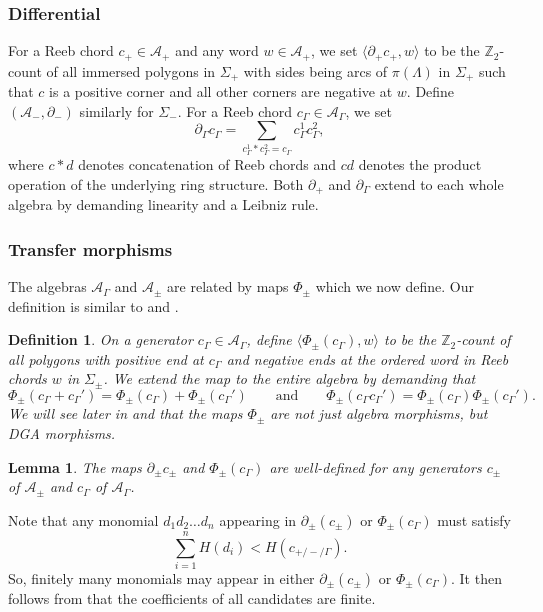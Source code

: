 \documentclass[11pt]{amsart}
\makeatletter
\renewenvironment{proof}[1][\proofname] {\par\pushQED{\qed}{\normalfont\bfseries\topsep6\p@\@plus6\p@\relax #1\@addpunct{.} }}{\popQED\endtrivlist\@endpefalse}
\theoremstyle{mystyle}
\newtheorem{definition}{Definition}[section]
\newtheorem{lemma}[lemma]{Lemma}
\newcommand{\Z}{\mathbb{Z}}
\newcommand{\<}{\langle}
\renewcommand{\>}{\rangle}
\makeatother
\begin{document}
\subsubsection{Differential}
For a Reeb chord $c_+\in \mathcal{A}_+$ and any word $w\in \mathcal{A}_+$, we set $\<\partial_+ c_+,w\>$ to be the $\Z_2$-count of all immersed polygons in $\Sigma_+$ with sides being arcs of $\pi(\Lambda)$ in $\Sigma_+$ such that $c$ is a positive corner and all other corners are negative at $w$. Define $(\mathcal{A}_-, \partial_-)$ similarly for $\Sigma_-$. For a Reeb chord $c_\Gamma\in \mathcal{A}_\Gamma$, we set
 \[\partial_\Gamma c_\Gamma = \sum_{c_\Gamma^1 *c_\Gamma^2 = c_\Gamma} c_\Gamma^1 c_\Gamma^2,\] where $c * d$ denotes concatenation of Reeb chords and $cd$ denotes the product operation of the underlying ring structure. Both $\partial_+$ and $\partial_\Gamma$ extend to each whole algebra by demanding linearity and a Leibniz rule. 
 
 \subsubsection{Transfer morphisms} The algebras $\mathcal{A}_\Gamma$ and $\mathcal{A}_\pm$ are related by maps $\Phi_\pm$ which we now define. Our definition is similar to \cite[Sec. 2.2]{sivek2011bordered} and \cite[Dfn. 6.7]{pan2021functorial}.
 
\begin{definition}\label{dfn:phipm}
    On a generator $c_\Gamma\in \mathcal{A}_\Gamma$, define $\<\Phi_\pm(c_\Gamma), w\>$ to be the $\Z_2$-count of all polygons with positive end at $c_\Gamma$ and negative ends at the ordered word in Reeb chords $w$ in $\Sigma_\pm$. We extend the map to the entire algebra by demanding that \[\Phi_\pm(c_\Gamma+c_\Gamma') = \Phi_\pm(c_\Gamma)+\Phi_\pm(c_\Gamma')\qquad \text{and}\qquad \Phi_\pm (c_\Gamma c_\Gamma') = \Phi_\pm(c_\Gamma)\Phi_\pm(c_\Gamma').\] 
    We will see later in  and  that the maps $\Phi_\pm$ are not just algebra morphisms, but DGA morphisms. 
\end{definition}

\begin{lemma}\label{lem:dphiwelldefined}
    The maps $\partial_\pm c_\pm$ and $\Phi_\pm(c_\Gamma)$ are well-defined for any generators $c_\pm$ of $\mathcal{A}_\pm$ and $c_\Gamma$ of $\mathcal{A}_\Gamma$.
\end{lemma}

\begin{proof}
    Note that any monomial $d_1d_2\dots d_n$ appearing in $\partial_\pm(c_\pm)$ or $\Phi_\pm(c_\Gamma)$ must satisfy \[\sum_{i = 1}^n H(d_i) < H(c_{+/-/\Gamma}).\] 
    So, finitely many monomials may appear in either $\partial_\pm(c_\pm)$ or $\Phi_\pm(c_\Gamma)$. It then follows from   that the coefficients of all candidates are finite.
\end{proof}
\end{document}
